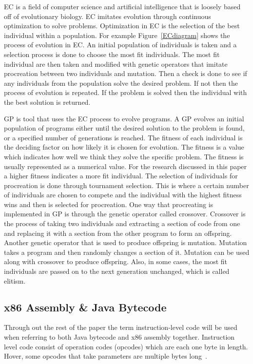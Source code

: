 \documentclass{sig-alternate}
\begin{document}
EC is a field of computer science and artificial intelligence that is loosely based off of evolutionary biology. EC imitates evolution through continuous optimization to solve problems. Optimization in EC is the selection of the best individual within a population. For example Figure~\ref{ECdiagram} shows the process of evolution in EC. An initial population of individuals is taken and a selection process is done to choose the most fit individuals. The most fit individual are then taken and modified with genetic operators that imitate procreation between two individuals and mutation. Then a check is done to see if any individuals from the population solve the desired problem. If not then the process of evolution is repeated. If the problem is solved then the individual with the best solution is returned.\par
	GP is tool that uses the EC process to evolve programs. A GP evolves an initial population of programs either until the desired solution to the problem is found, or a specified number of generations is reached. The fitness of each individual is the deciding factor on how likely it is chosen for evolution. The fitness is a value which indicates how well we think they solve the specific problem. The fitness is usually represented as a numerical value. For the research discussed in this paper a higher fitness indicates a more fit individual. The selection of individuals for procreation is done through tournament selection. This is where a certain number of individuals are chosen to compete and the individual with the highest fitness wins and then is selected for procreation. One way that procreating is implemented in GP is through the genetic operator called crossover. Crossover is the process of taking two individuals and extracting a section of code from one and replacing it with a section from the other program to form an offspring. Another genetic operator that is used to produce offspring is mutation. Mutation takes a program and then randomly changes a section of it. Mutation can be used along with crossover to produce offspring. Also, in some cases, the most fit individuals are passed on to the next generation unchanged, which is called elitism.


\subsection{x86 Assembly \& Java Bytecode}


Through out the rest of the paper the term instruction-level code will be used when referring to both Java bytecode and x86 assembly together. Instruction level code consist of operation codes (opcodes) which are each one byte in length. Hover, some opcodes that take parameters are multiple bytes long~\cite{JavaBytecode:2014,x86tomachine:2013}.
\end{document}

